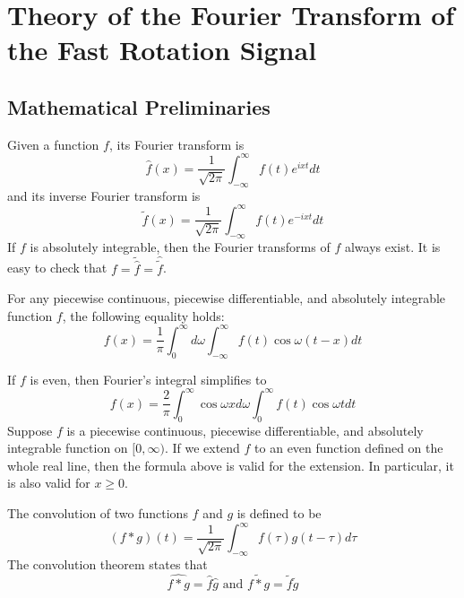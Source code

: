\newpage
\section{Theory of the Fourier Transform of the Fast Rotation Signal}

\subsection{Mathematical Preliminaries}

\begin{definition}
Given a function $f$, its Fourier transform is \[\hat{f}(x)=\frac{1}{\sqrt{2\pi}}\int^{\infty}_{-\infty}f(t)e^{ixt}dt\] and its inverse Fourier transform is \[\tilde{f}(x)=\frac{1}{\sqrt{2\pi}}\int^{\infty}_{-\infty}f(t)e^{-ixt}dt\] If $f$ is absolutely integrable, then the Fourier transforms of $f$ always exist. It is easy to check that $f=\tilde{\hat{f}}=\hat{\tilde{f}}$.
\end{definition}

\begin{theorem}
For any piecewise continuous, piecewise differentiable, and absolutely integrable function $f$, the following equality holds: \[f(x)=\frac{1}{\pi}\int^{\infty}_0d\omega\int^{\infty}_{-\infty}f(t)\cos\omega(t-x)dt\]
\end{theorem}

If $f$ is even, then Fourier's integral simplifies to \[f(x)=\frac{2}{\pi}\int^{\infty}_0\cos\omega xd\omega\int^{\infty}_0f(t)\cos\omega tdt\]Suppose $f$ is a piecewise continuous, piecewise differentiable, and absolutely integrable function on $[0,\infty)$. If we extend $f$ to an even function defined on the whole real line, then the formula above is valid for the extension. In particular, it is also valid for $x\geq 0$.

\begin{theorem}
The convolution of two functions $f$ and $g$ is defined to be \[(f\ast g)(t)=\frac{1}{\sqrt{2\pi}}\int^{\infty}_{-\infty}f(\tau)g(t-\tau)d\tau\] The convolution theorem states that \[\widehat{f\ast g}=\hat{f}\hat{g} \text{ and } \widetilde{f\ast g}=\tilde{f}\tilde{g}\] 
\end{theorem}


